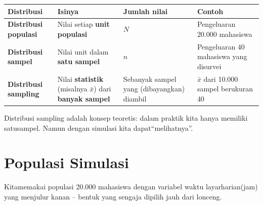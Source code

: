 \documentclass[
  indonesian,
  letterpaper,
]{book}
\newcounter{none} %
\begin{document}
{\def\LTcaptype{none} %
\begin{longtable}[]{@{}
  >{\raggedright\arraybackslash}p{}
  >{\raggedright\arraybackslash}p{}
  >{\raggedright\arraybackslash}p{}
  >{\raggedright\arraybackslash}p{}@{}}
\toprule\noalign{}
\begin{minipage}[b]{\linewidth}\raggedright
Distribusi
\end{minipage} & \begin{minipage}[b]{\linewidth}\raggedright
Isinya
\end{minipage} & \begin{minipage}[b]{\linewidth}\raggedright
Jumlah nilai
\end{minipage} & \begin{minipage}[b]{\linewidth}\raggedright
Contoh
\end{minipage} \\
\midrule\noalign{}
\endhead
\bottomrule\noalign{}
\endlastfoot
\textbf{Distribusi populasi} & Nilai setiap \textbf{unit populasi} &
\(N\) & Pengeluaran 20.000 mahasiswa \\
\textbf{Distribusi sampel} & Nilai unit dalam \textbf{satu sampel} &
\(n\) & Pengeluaran 40 mahasiswa yang disurvei \\
\textbf{Distribusi sampling} & Nilai \textbf{statistik} (misalnya
\(\bar{x}\)) dari \textbf{banyak sampel} & Sebanyak sampel yang
(dibayangkan) diambil & \(\bar{x}\) dari 10.000 sampel berukuran 40 \\
\end{longtable}
}

Distribusi sampling adalah konsep teoretis: dalam praktik kita hanya
memiliki satusampel. Namun dengan simulasi kita dapat``melihatnya''.

\section{Populasi Simulasi}\label{populasi-simulasi}

Kitamemakai populasi 20.000 mahasiswa dengan variabel waktu
layarharian(jam) yang menjulur kanan -- bentuk yang sengaja dipilih jauh
dari lonceng.
\end{document}
